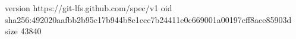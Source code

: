 version https://git-lfs.github.com/spec/v1
oid sha256:492020aafbb2b95c17b944b8e1ccc7b24411e0c669001a00197cff8ace85903d
size 43840
